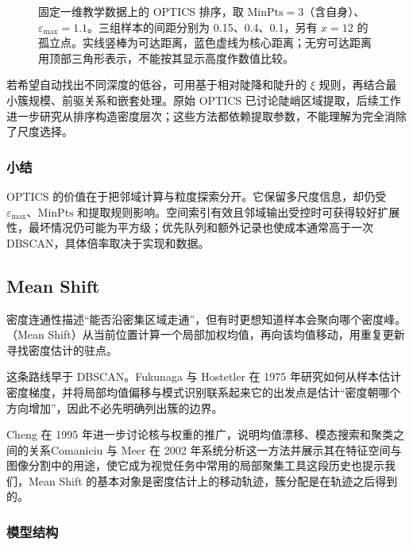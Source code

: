\begin{figure}[htbp]
 \centering
 
 \caption{固定一维教学数据上的 OPTICS 排序，取 $\mathrm{MinPts}=3$（含自身）、$\varepsilon_{\max}=1.1$。三组样本的间距分别为 0.15、0.4、0.1，另有 $x=12$ 的孤立点。实线竖棒为可达距离，蓝色虚线为核心距离；无穷可达距离用顶部三角形表示，不能按其显示高度作数值比较。}
 \label{fig:clustering-optics-reachability}
\end{figure}

若希望自动找出不同深度的低谷，可用基于相对陡降和陡升的 $\xi$ 规则，再结合最小簇规模、前驱关系和嵌套处理。原始 OPTICS 已讨论陡峭区域提取，后续工作进一步研究从排序构造密度层次；这些方法都依赖提取参数，不能理解为完全消除了尺度选择。

\subsubsection{小结}

OPTICS 的价值在于把邻域计算与粒度探索分开。它保留多尺度信息，却仍受 $\varepsilon_{\max}$、$\mathrm{MinPts}$ 和提取规则影响。空间索引有效且邻域输出受控时可获得较好扩展性，最坏情况仍可能为平方级；优先队列和额外记录也使成本通常高于一次 DBSCAN，具体倍率取决于实现和数据。

\subsection{Mean Shift}
\label{sec:clustering-mean-shift}

密度连通性描述“能否沿密集区域走通”，但有时更想知道样本会聚向哪个密度峰。（Mean Shift）从当前位置计算一个局部加权均值，再向该均值移动，用重复更新寻找密度估计的驻点。

\Needspace{125mm}
这条路线早于 DBSCAN。Fukunaga 与 Hostetler 在 1975 年研究如何从样本估计密度梯度，并将局部均值偏移与模式识别联系起来它的出发点是估计“密度朝哪个方向增加”，因此不必先明确列出簇的边界。

Cheng 在 1995 年进一步讨论核与权重的推广，说明均值漂移、模态搜索和聚类之间的关系Comaniciu 与 Meer 在 2002 年系统分析这一方法并展示其在特征空间与图像分割中的用途，使它成为视觉任务中常用的局部聚集工具这段历史也提示我们，Mean Shift 的基本对象是密度估计上的移动轨迹，簇分配是在轨迹之后得到的。

\subsubsection{模型结构}

